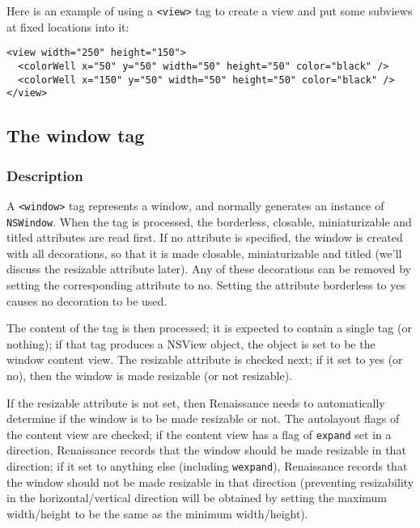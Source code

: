 Here is an example of using a \texttt{<view>} tag to create a view and
put some subviews at fixed locations into it:
\begin{verbatim}
<view width="250" height="150">
  <colorWell x="50" y="50" width="50" height="50" color="black" />
  <colorWell x="150" y="50" width="50" height="50" color="black" />
</view>
\end{verbatim}

\subsection{The window tag}
\subsubsection{Description}
A \texttt{<window>} tag represents a window, and normally generates an
instance of \texttt{NSWindow}.  When the tag is processed, the
borderless, closable, miniaturizable and titled attributes are read
first.  If no attribute is specified, the window is created with all
decorations, so that it is made closable, miniaturizable and titled
(we'll discuss the resizable attribute later).  Any of these
decorations can be removed by setting the corresponding attribute to
no.  Setting the attribute borderless to yes causes no decoration to
be used.

The content of the tag is then processed; it is expected to contain a
single tag (or nothing); if that tag produces a NSView object, the
object is set to be the window content view.  The resizable attribute
is checked next; if it set to yes (or no), then the window is made
resizable (or not resizable).

If the resizable attribute is not set, then Renaissance needs to
automatically determine if the window is to be made resizable or not.
The autolayout flags of the content view are checked; if the content
view has a flag of \texttt{expand} set in a direction, Renaissance
records that the window should be made resizable in that direction; if
it set to anything else (including \texttt{wexpand}), Renaissance
records that the window should not be made resizable in that direction
(preventing resizability in the horizontal/vertical direction will be
obtained by setting the maximum width/height to be the same as the
minimum width/height).

